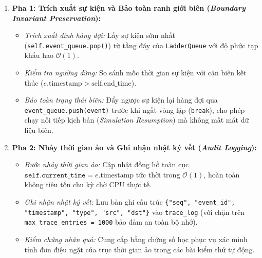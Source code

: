 \begin{enumerate}[leftmargin=1.8em, itemsep=1.5pt, topsep=1.5pt]
\item \textbf{Pha 1: Trích xuất sự kiện và Bảo toàn ranh giới biên (\textit{Boundary Invariant Preservation}):}
\begin{itemize}[leftmargin=1.2em, itemsep=0.5pt]
\item \textit{Trích xuất đỉnh hàng đợi:} Lấy sự kiện sớm nhất (\texttt{self.event\_queue.pop()}) từ tầng đáy của \texttt{LadderQueue} với độ phức tạp khấu hao $\mathcal{O}(1)$.
\item \textit{Kiểm tra ngưỡng dừng:} So sánh mốc thời gian sự kiện với cận biên kết thúc ($e.\text{timestamp} > \text{self.end\_time}$).
\item \textit{Bảo toàn trạng thái biên:} Đẩy ngược sự kiện lại hàng đợi qua \texttt{event\_queue.push(event)} trước khi ngắt vòng lặp (\texttt{break}), cho phép chạy nối tiếp kịch bản (\textit{Simulation Resumption}) mà không mất mát dữ liệu biên.
\end{itemize}

\item \textbf{Pha 2: Nhảy thời gian ảo và Ghi nhận nhật ký vết (\textit{Audit Logging}):}
\begin{itemize}[leftmargin=1.2em, itemsep=0.5pt]
\item \textit{Bước nhảy thời gian ảo:} Cập nhật đồng hồ toàn cục $\texttt{self.current\_time} = e.\text{timestamp}$ tức thời trong $\mathcal{O}(1)$, hoàn toàn không tiêu tốn chu kỳ chờ CPU thực tế.
\item \textit{Ghi nhận nhật ký vết:} Lưu bản ghi cấu trúc \texttt{\{"seq", "event\_id", "timestamp", "type", "src", "dst"\}} vào \texttt{trace\_log} (với chặn trên \texttt{max\_trace\_entries = 1000} bảo đảm an toàn bộ nhớ).
\item \textit{Kiểm chứng nhân quả:} Cung cấp bằng chứng số học phục vụ xác minh tính đơn điệu ngặt của trục thời gian ảo trong các bài kiểm thử tự động.
\end{itemize}


\end{enumerate}
